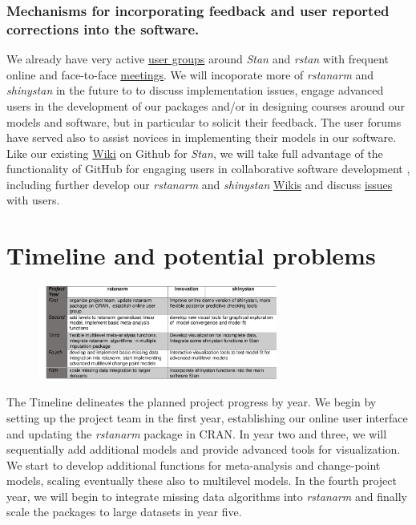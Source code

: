 \documentclass[11pt,notitlepage]{article}
\begin{document}
\subsubsection*{Mechanisms for incorporating feedback and user reported corrections into the software.}

We already have very active \href{https://groups.google.com/forum/#!forum/stan-users} {user groups} around \textit{Stan} and 
\textit{rstan}  with frequent online and face-to-face \href{http://www.meetup.com/bda-group/}{meetings}. We will incoporate more of
\textit{rstanarm} and \textit{shinystan} in the future to to discuss implementation issues, engage advanced users in the development of 
our packages and/or in designing courses around our models and software, but in particular to solicit their feedback. The user 
forums have served also to assist novices in implementing their models in our software.
Like our existing \href{https://github.com/stan-dev/example-models/wiki}{Wiki} on Github for \textit{Stan}, we will 
take full advantage of the functionality of GitHub for engaging users in collaborative software development \cite{loeliger2012version}, 
including further develop our \textit{rstanarm} and \textit{shinystan} 
\href{https://github.com/stan-dev/rstanarm/wiki}{Wikis} and discuss \href{https://github.com/stan-dev/rstanarm/issues}{issues} with users.

\section*{Timeline and potential problems}

\begin{figure} %
 \vspace*{-12pt}
    \centering
  \includegraphics[width=0.7\textwidth]{Figures/Timeline.pdf}
 \vspace*{-15pt}
\end{figure}

The Timeline delineates the planned project progress by year. We begin by setting up the project team in the first year, 
establishing our online user interface and updating the \textit{rstanarm} package in CRAN. In year two and three, we will sequentially 
add additional models and provide advanced tools for visualization. We start to develop additional functions for meta-analysis and 
change-point models, scaling eventually these also to multilevel models. In the fourth project year, we will begin to integrate 
missing data algorithms into \textit{rstanarm} and finally scale the packages to large datasets in year five.
\end{document}
